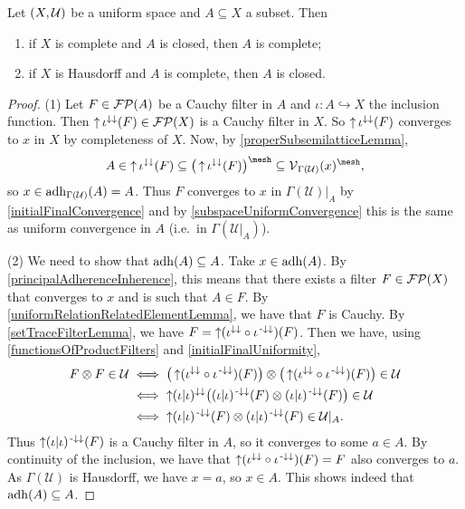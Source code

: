 \begin{proposition} \label{closedComplete}
Let $\sSet{X,\mathcal{U}}$ be a uniform space and $A\subseteq X$ a subset. Then
\begin{enumerate}
\item if $X$ is complete and $A$ is closed, then $A$ is complete;
\item if $X$ is Hausdorff and $A$ is complete, then $A$ is closed.
\end{enumerate}
\end{proposition}
\begin{proof}
(1) Let $F\in\operatorname{\mathcal{FP}}(A)$ be a Cauchy filter in $A$ and $\iota: A\hookrightarrow X$ the inclusion function. Then $\operatorname{\uparrow} \iota^{\downarrow\downarrow}(F)\in\operatorname{\mathcal{FP}}(X)$ is a Cauchy filter in $X$. So $\operatorname{\uparrow} \iota^{\downarrow\downarrow}(F)$ converges to $x$ in $X$ by completeness of $X$. Now, by \ref{properSubsemilatticeLemma},
\[ A \in \upset \iota^{\imf\imf}(F) \subseteq \big(\upset \iota^{\imf\imf}(F)\big)^{\mesh} \subseteq \vicinity_{\Gamma(\mathcal{U})}(x)^{\mesh}, \]
so $x\in \operatorname{adh}_{\Gamma(\mathcal{U})}(A) = A$. Thus $F$ converges to $x$ in $\Gamma(\mathcal{U})|_A$ by \ref{initialFinalConvergence} and by \ref{subspaceUniformConvergence} this is the same as uniform convergence in $A$ (i.e.\ in $\Gamma(\mathcal{U}|_A)$).

(2) We need to show that $\operatorname{adh}(A)\subseteq A$. Take $x\in \operatorname{adh}(A)$. By \ref{principalAdherenceInherence}, this means that there exists a filter $F\in \operatorname{\mathcal{FP}}(X)$ that converges to $x$ and is such that $A\in F$. By \ref{uniformRelationRelatedElementLemma}, we have that $F$ is Cauchy. By \ref{setTraceFilterLemma}, we have $F = \operatorname{\uparrow}(\iota^{\downarrow\downarrow}\circ \iota^{{\text{\hspace{0.15em}-}\downarrow}\downarrow})(F)$. Then we have, using \ref{functionsOfProductFilters} and \ref{initialFinalUniformity},
\begin{align*}
F\otimes F \in \mathcal{U} &\iff \big(\operatorname{\uparrow}(\iota^{\downarrow\downarrow}\circ \iota^{{\text{\hspace{0.15em}-}\downarrow}\downarrow})(F)\big)\otimes \big(\operatorname{\uparrow}(\iota^{\downarrow\downarrow}\circ \iota^{{\text{\hspace{0.15em}-}\downarrow}\downarrow})(F)\big) \in \mathcal{U} \\
&\iff \operatorname{\uparrow}(\iota|\iota)^{\downarrow\downarrow}\big((\iota|\iota)^{{\text{\hspace{0.15em}-}\downarrow}\downarrow}(F)\otimes (\iota|\iota)^{{\text{\hspace{0.15em}-}\downarrow}\downarrow}(F)\big) \in \mathcal{U} \\
&\iff \operatorname{\uparrow} (\iota|\iota)^{{\text{\hspace{0.15em}-}\downarrow}\downarrow}(F)\otimes (\iota|\iota)^{{\text{\hspace{0.15em}-}\downarrow}\downarrow}(F) \in \mathcal{U}|_A.
\end{align*}
Thus $\operatorname{\uparrow} (\iota|\iota)^{{\text{\hspace{0.15em}-}\downarrow}\downarrow}(F)$ is a Cauchy filter in $A$, so it converges to some $a\in A$. By continuity of the inclusion, we have that $\operatorname{\uparrow}(\iota^{\downarrow\downarrow}\circ \iota^{{\text{\hspace{0.15em}-}\downarrow}\downarrow})(F) = F$ also converges to $a$. As $\Gamma(\mathcal{U})$ is Hausdorff, we have $x = a$, so $x\in A$. This shows indeed that $\operatorname{adh}(A)\subseteq A$.
\end{proof}

